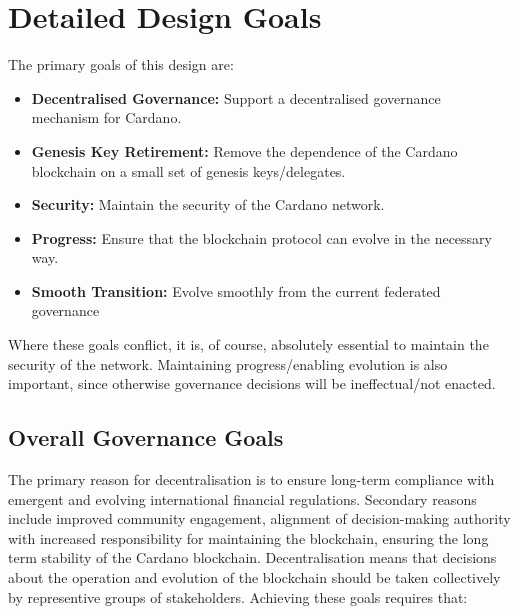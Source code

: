 \section{Detailed Design Goals}
\label{sect:goals}

The primary goals of this design are:

\begin{itemize}
\item
  \textbf{Decentralised Governance:}
  Support a decentralised governance mechanism for Cardano.
\item
  \textbf{Genesis Key Retirement:}
  Remove the dependence of the Cardano blockchain on a small set of genesis keys/delegates.
\item
  \textbf{Security:}
  Maintain the security of the Cardano network.
\item
  \textbf{Progress:}
  Ensure that the blockchain protocol can evolve in the necessary way.
\item
  \textbf{Smooth Transition:}
  Evolve smoothly from the current federated governance
\end{itemize}

Where these goals conflict, it is, of course, absolutely essential to maintain the security of the network.  Maintaining progress/enabling
evolution is also important, since otherwise governance decisions will be ineffectual/not enacted.

\pagebreak
\subsection{Overall Governance Goals}

The primary reason for decentralisation is to ensure long-term compliance with emergent and evolving international financial regulations.
Secondary reasons include improved community engagement, alignment of decision-making authority with increased responsibility for maintaining the blockchain,
ensuring the long term stability of the Cardano blockchain.  Decentralisation means that decisions about the operation and evolution of the blockchain
should be taken collectively by representive groups of stakeholders.
%
Achieving these goals requires that:

